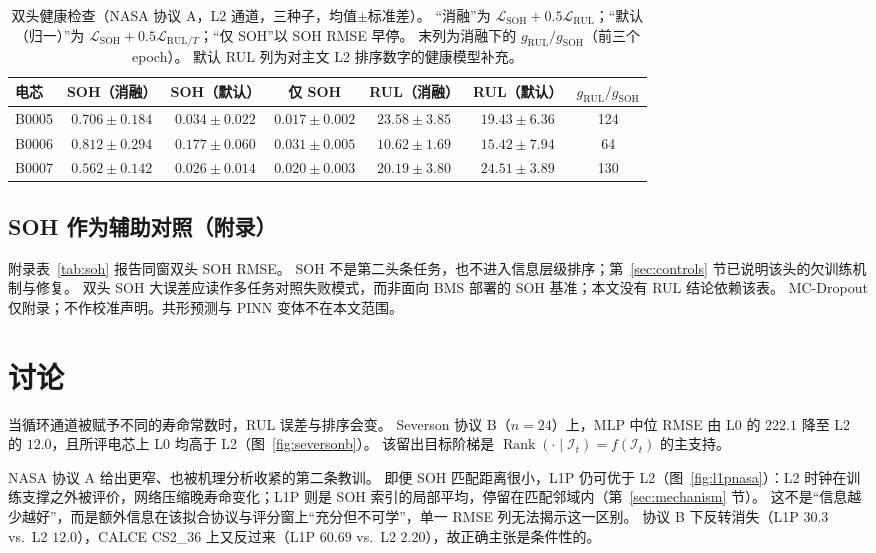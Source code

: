 \documentclass[UTF8,a4paper,12pt]{ctexart}
\begin{document}
\begin{table}[htbp]
\centering
\small
\caption{双头健康检查（NASA 协议 A，L2 通道，三种子，均值$\pm$标准差）。
``消融''为 $\mathcal{L}_{\mathrm{SOH}}+0.5\mathcal{L}_{\mathrm{RUL}}$；``默认（归一）''为 $\mathcal{L}_{\mathrm{SOH}}+0.5\mathcal{L}_{\mathrm{RUL}/T}$；``仅 SOH''以 SOH RMSE 早停。
末列为消融下的 $g_{\mathrm{RUL}}/g_{\mathrm{SOH}}$（前三个 epoch）。
默认 RUL 列为对主文 L2 排序数字的健康模型补充。}
\label{tab:sohcontrol}
\begin{tabular}{@{}lcccccc@{}}
\toprule
电芯 & SOH（消融） & SOH（默认） & 仅 SOH & RUL（消融） & RUL（默认） & $g_{\mathrm{RUL}}/g_{\mathrm{SOH}}$ \\
\midrule
B0005 & $0.706\pm0.184$ & $0.034\pm0.022$ & $0.017\pm0.002$ & $23.58\pm3.85$ & $19.43\pm6.36$ & 124 \\
B0006 & $0.812\pm0.294$ & $0.177\pm0.060$ & $0.031\pm0.005$ & $10.62\pm1.69$ & $15.42\pm7.94$ & 64 \\
B0007 & $0.562\pm0.142$ & $0.026\pm0.014$ & $0.020\pm0.003$ & $20.19\pm3.80$ & $24.51\pm3.89$ & 130 \\
\bottomrule
\end{tabular}
\end{table}

\subsection{SOH 作为辅助对照（附录）}
\label{sec:soh}

附录表~\ref{tab:soh} 报告同窗双头 SOH RMSE。
SOH 不是第二头条任务，也不进入信息层级排序；第~\ref{sec:controls} 节已说明该头的欠训练机制与修复。
双头 SOH 大误差应读作多任务对照失败模式，而非面向 BMS 部署的 SOH 基准；本文没有 RUL 结论依赖该表。
MC-Dropout 仅附录；不作校准声明。共形预测与 PINN 变体不在本文范围。

\section{讨论}
\label{sec:discussion}

当循环通道被赋予不同的寿命常数时，RUL 误差与排序会变。
Severson 协议 B（$n{=}24$）上，MLP 中位 RMSE 由 L0 的 $222.1$ 降至 L2 的 $12.0$，且所评电芯上 L0 均高于 L2（图~\ref{fig:seversonb}）。
该留出目标阶梯是 $\operatorname{Rank}(\cdot\mid\mathcal{I}_t)=f(\mathcal{I}_t)$ 的主支持。

NASA 协议 A 给出更窄、也被机理分析收紧的第二条教训。
即便 SOH 匹配距离很小，L1P 仍可优于 L2（图~\ref{fig:l1pnasa}）：L2 时钟在训练支撑之外被评价，网络压缩晚寿命变化；L1P 则是 SOH 索引的局部平均，停留在匹配邻域内（第~\ref{sec:mechanism} 节）。
这不是“信息越少越好”，而是额外信息在该拟合协议与评分窗上“充分但不可学”，单一 RMSE 列无法揭示这一区别。
协议 B 下反转消失（L1P $30.3$ vs.\ L2 $12.0$），CALCE CS2\_36 上又反过来（L1P $60.69$ vs.\ L2 $2.20$），故正确主张是条件性的。
\end{document}
